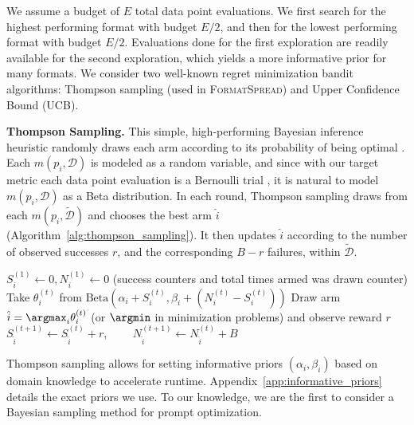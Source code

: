 \documentclass{article} %
\renewcommand{\paragraph}[1]{\textbf{#1}}
\newcommand{\toolname}[1]{}
\renewcommand{\toolname}[1]{{\color{black} \textsc{FormatSpread}}}
\begin{document}
We assume a budget of $E$ total data point evaluations. 
We first search for the highest performing format with budget $E/2$, and then for the lowest performing format with budget $E/2$. Evaluations done for the first exploration are readily available for the second exploration, which yields a more informative prior for many formats.
We consider two well-known regret minimization bandit algorithms: Thompson sampling (used in \toolname{}) and Upper Confidence Bound (UCB).


\paragraph{Thompson Sampling.} This simple, high-performing Bayesian inference heuristic randomly draws each arm according to its probability of being optimal \citep{chapelle2011empirical}. Each $m(p_i,\mathcal{D})$ is modeled as a random variable, and since with our target metric each data point evaluation is a Bernoulli trial%
, it is natural to model $m(p_i, \mathcal{D})$ as a Beta distribution. In each round, Thompson sampling draws from each $m(p_i, \mathcal{\tilde{D}})$ and chooses the best arm $\hat{i}$ (Algorithm~\ref{alg:thompson_sampling}). 
It then updates $\hat{i}$ according to the number of observed successes $r$, and the corresponding $B-r$ failures, within $\mathcal{\tilde{D}}$. 

\begin{algorithm}
\caption{Thompson Sampling for Bernoulli Bandits}\label{alg:thompson_sampling}
\begin{algorithmic}
\begin{footnotesize}
\State $S_i^{(1)} \gets 0, N_i^{(1)} \gets 0$ (success counters and total times armed was drawn counter)
\State Take $\theta_i^{(t)}$ from $\text{Beta}(\alpha_i + S_i^{(t)}, \beta_i + (N_i^{(t)} - S_i^{(t)}))$
\EndFor
\State Draw arm $\hat{i}=\argmax_i \theta_i^{(t)}$ (or $\argmin$ in minimization problems) and observe reward $r$
\State $S_{\hat{i}}^{(t+1)} \gets S_{\hat{i}}^{(t)} + r$, \ \ \ \ $N_{\hat{i}}^{(t+1)} \gets N_{\hat{i}}^{(t)} + B$
\EndFor
\end{footnotesize}
\end{algorithmic}
\end{algorithm}

Thompson sampling allows for setting informative priors $(\alpha_i, \beta_i)$ based on domain knowledge to accelerate runtime. 
Appendix~\ref{app:informative_priors} details the exact priors we use. To our knowledge, we are the first to consider a Bayesian sampling method for prompt optimization. 
\end{document}
